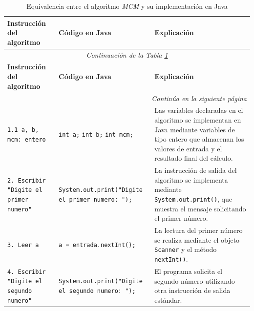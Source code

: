 \documentclass[12pt,twoside]{book}
\begin{document}
					\begin{landscape}
						
						\begin{longtable}{p{6cm} p{6cm} p{7.5cm}}
							
							\caption{Equivalencia entre el algoritmo \textit{MCM} y su implementación en Java}
							\label{tab:equivalenciaMCM} \\
							
							\toprule
							\textbf{Instrucción del algoritmo} & \textbf{Código en Java} & \textbf{Explicación} \\
							\midrule
							\endfirsthead
							
							\multicolumn{3}{c}{\textit{Continuación de la Tabla \ref{tab:equivalenciaMCM}}} \\
							\toprule
							\textbf{Instrucción del algoritmo} & \textbf{Código en Java} & \textbf{Explicación} \\
							\midrule
							\endhead
							
							\midrule
							\multicolumn{3}{r}{\textit{Continúa en la siguiente página}} \\
							\endfoot
							
							\bottomrule
							\endlastfoot
							
							
							\texttt{1.1 a, b, mcm: entero}
							&
							\texttt{int a;} \newline
							\texttt{int b;} \newline
							\texttt{int mcm;}
							&
							Las variables declaradas en el algoritmo se implementan en Java mediante variables de tipo entero que almacenan los valores de entrada y el resultado final del cálculo. \\
							
							
							\texttt{2. Escribir "Digite el primer numero"}
							&
							\texttt{System.out.print("Digite el primer numero: ");}
							&
							La instrucción de salida del algoritmo se implementa mediante \texttt{System.out.print()}, que muestra el mensaje solicitando el primer número. \\
							
							
							\texttt{3. Leer a}
							&
							\texttt{a = entrada.nextInt();}
							&
							La lectura del primer número se realiza mediante el objeto \texttt{Scanner} y el método \texttt{nextInt()}. \\
							
							
							\texttt{4. Escribir "Digite el segundo numero"}
							&
							\texttt{System.out.print("Digite el segundo numero: ");}
							&
							El programa solicita el segundo número utilizando otra instrucción de salida estándar. \\
							

\end{longtable}
\end{landscape}
\end{document}
